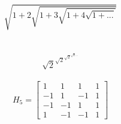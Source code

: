 $$\sqrt{1+2\sqrt{1+3\sqrt{1 + 4\sqrt{1+...}}}}$$ \\
\\
$$\sqrt{2}^{\sqrt{2}^{\sqrt{2}^{\sqrt{2}...}}}$$
\\
$$H_5 = 
\begin{bmatrix} 
1 & 1 & 1 & 1\\
-1 & 1 & -1 & 1\\
-1 & -1 & 1 & 1\\
1 & -1 & -1 & 1
\end{bmatrix}
$$
